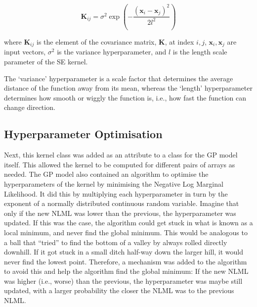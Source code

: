 \documentclass[12pt]{article}
\begin{document}
    \begin{equation}
        \mathbf{K}_{ij} = \sigma^2 \exp\left(-\frac{(\mathbf{x}_i - \mathbf{x}_j)^2}{2l^2}\right) \label{eq:se-kernel}
    \end{equation}

    \noindent where $\mathbf{K}_{ij}$ is the element of the covariance matrix, $\mathbf{K}$, at index $i, j$, $\mathbf{x}_i, \mathbf{x}_j$ are input vectors, $\sigma^2$ is the variance hyperparameter, and $l$ is the length scale parameter of the SE kernel.

    The `variance' hyperparameter is a scale factor that determines the average distance of the function away from its mean, whereas the `length' hyperparameter determines how smooth or wiggly the function is, i.e., how fast the function can change direction.

    \subsection{Hyperparameter Optimisation}
    Next, this kernel class was added as an attribute to a class for the GP model itself.
    This allowed the kernel to be computed for different pairs of arrays as needed.
    The GP model also contained an algorithm to optimise the hyperparameters of the kernel by minimising the Negative Log Marginal Likelihood.
    It did this by multiplying each hyperparameter in turn by the exponent of a normally distributed continuous random variable.
    Imagine that only if the new NLML was lower than the previous, the hyperparameter was updated.
    If this was the case, the algorithm could get stuck in what is known as a local minimum, and never find the global minimum.
    This would be analogous to a ball that ``tried'' to find the bottom of a valley by always rolled directly downhill.
    If it got stuck in a small ditch half-way down the larger hill, it would never find the lowest point.
    Therefore, a mechanism was added to the algorithm to avoid this and help the algorithm find the global minimum:
    If the new NLML was higher (i.e., worse) than the previous, the hyperparameter was maybe still updated, with a larger probability the closer the NLML was to the previous NLML.
\end{document}
